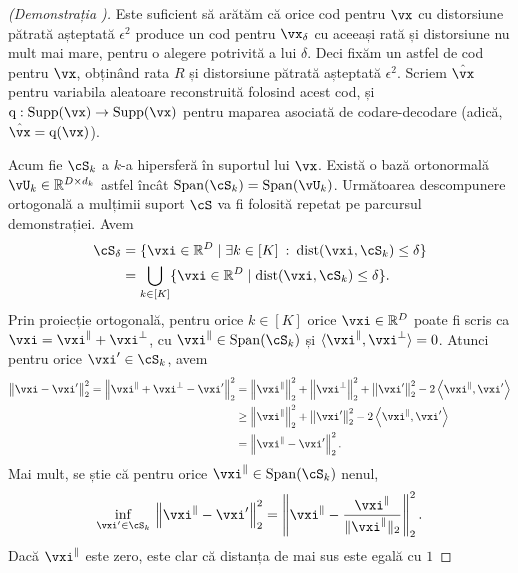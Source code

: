 \documentclass[../../book-main_ro.tex]{subfiles}
\begin{document}
\begin{proof}[(Demonstrația )]
    Este suficient să arătăm că orice cod pentru $\vx$ cu distorsiune pătrată așteptată
    $\epsilon^2$ produce un cod pentru $\vx_{\delta}$ cu aceeași rată și
    distorsiune nu mult mai mare, pentru o alegere potrivită a lui $\delta$.
    Deci fixăm un astfel de cod pentru $\vx$, obținând rata $R$ și distorsiune pătrată
    așteptată $\epsilon^2$. Scriem $\hat{\vx}$ pentru variabila aleatoare
    reconstruită folosind acest cod, și $\mathrm{q} : \Supp(\vx) \to \Supp(\vx)$
    pentru maparea asociată de codare-decodare (adică, $\hat{\vx}
    = \mathrm{q}(\vx)$).

    Acum fie $\cS_k$ a $k$-a hipersferă în suportul lui $\vx$.
    Există o bază ortonormală $\vU_{k} \in \R^{D \times d_k}$ astfel încât
    $\Span(\cS_k) = \Span(\vU_k)$.
    Următoarea descompunere ortogonală a mulțimii suport $\cS$
    va fi folosită repetat pe parcursul demonstrației.
    Avem
    \begin{align}
        \cS_{\delta} 
        &= \set{\vxi \in \R^D \given \exists k \in [K] \::\: \dist(\vxi,
        \cS_k) \leq \delta}
        \\
        &= \bigcup_{k \in [K]} \set{\vxi \in \R^D \given \dist(\vxi,
        \cS_k) \leq \delta}.
    \end{align}
    Prin proiecție ortogonală, pentru orice $k \in [K]$ orice $\vxi \in \R^D$ poate fi
    scris ca $\vxi = \vxi^{\|} + \vxi^{\perp}$, cu $\vxi^{\|} \in \Span(\cS_k)$
    și $\ip{\vxi^{\|}}{\vxi^\perp} = 0$.
    Atunci pentru orice $\vxi' \in \cS_k$, avem
    \begin{align}
        \norm*{\vxi - \vxi'}_2^2 
        = 
        \norm*{\vxi^{\|} + \vxi^{\perp} - \vxi'}_2^2
        &=
        \norm*{\vxi^{\|}}_2^2 + \norm*{\vxi^{\perp}}_2^2 + \norm*{\vxi'}_2^2
        - 2 \ip*{\vxi^{\|}}{\vxi'}
        \\
        &\geq
        \norm*{\vxi^{\|}}_2^2 + \norm*{\vxi'}_2^2
        - 2 \ip*{\vxi^{\|}}{\vxi'}
        \\
        &=
        \norm*{\vxi^{\|} - \vxi'}_2^2.
    \end{align}
    Mai mult, se știe că pentru orice $\vxi^{\|} \in \Span(\cS_k)$ nenul,
    \begin{equation}
        \inf_{\vxi' \in \cS_k}\,
        \norm*{\vxi^{\|} - \vxi'}_2^2
        =
        \norm*{\vxi^{\|} - \frac{\vxi^{\|}}{\norm{\vxi^{\|}}_2}}_2^2.
    \end{equation}
    Dacă $\vxi^{\|}$ este zero, este clar că distanța de mai sus este egală cu $1$

\end{proof}
\end{document}
